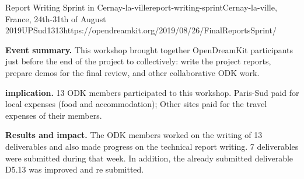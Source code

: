 \begin{event}{Report Writing Sprint in Cernay-la-ville}{report-writing-sprint}{Cernay-la-ville, France, 24th-31th of August 2019}{UPSud}{13}{13}{https://opendreamkit.org/2019/08/26/FinalReportsSprint/}

  \textbf{Event summary.} This workshop brought together OpenDreamKit
  participants just before the end of the project to collectively:
  write the project reports, prepare demos for the final review, and
  other collaborative ODK work.

  \textbf{\ODK implication.} 13 ODK members participated to this
  workshop. Paris-Sud paid for local expenses (food and
  accommodation); Other sites paid for the travel expenses of their
  members.

  \textbf{Results and impact.} The ODK members worked on the writing
  of 13 deliverables and also made progress on the technical report
  writing. 7 deliverables were submitted during that week. In
  addition, the already submitted deliverable D5.13 was improved and
  re submitted.
\end{event}
